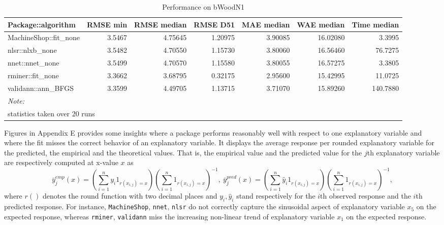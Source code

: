 \begin{Schunk}
\begingroup\fontsize{7}{9}\selectfont

\begin{longtable}[t]{lrrrrrr}
\caption{\label{tab:unnamed-chunk-4}Performance on bWoodN1}\\
\toprule
Package::algorithm & RMSE min & RMSE median & RMSE D51 & MAE median & WAE median & Time median\\
\midrule
MachineShop::fit\_none & 3.5467 & 4.75645 & 1.20975 & 3.90085 & 16.02080 & 3.3995\\
nlsr::nlxb\_none & 3.5482 & 4.70550 & 1.15730 & 3.80060 & 16.56460 & 76.7275\\
nnet::nnet\_none & 3.5499 & 4.70570 & 1.15580 & 3.80055 & 16.57275 & 3.3805\\
rminer::fit\_none & 3.3662 & 3.68795 & 0.32175 & 2.95600 & 15.42995 & 11.0725\\
validann::ann\_BFGS & 3.3599 & 4.49705 & 1.13715 & 3.71070 & 15.89260 & 140.7880\\
\bottomrule
\multicolumn{7}{l}{\textit{Note: }}\\
\multicolumn{7}{l}{statistics taken over 20 runs}\\
\end{longtable}
\endgroup{}

\end{Schunk}

Figures in Appendix E provides some insights where a package performs
reasonably well with respect to one explanatory variable and where the
fit misses the correct behavior of an explanatory variable. It displays
the average response per rounded explanatory variable for the predicted,
the empirical and the theoretical values. That is, the empirical value
and the predicted value for the \(j\)th explanatory variable are
respectively computed at x-value \(x\) as \[
\bar y^{emp}_j(x) =  \left(\sum_{i=1}^n y_i 1_{r(x_{i,j}) = x} \right)
\left(\sum_{i=1}^n 1_{r(x_{i,j}) = x}\right)^{-1},~
\bar y^{pred}_j(x) = \left(\sum_{i=1}^n \hat y_i 1_{r(x_{i,j}) = x} \right) 
\left(\sum_{i=1}^n 1_{r(x_{i,j}) = x}\right)^{-1} ,
\] where \(r()\) denotes the round function with two decimal places and
\(y_i, \hat y_i\) stand respectively for the \(i\)th observed response
and the \(i\)th predicted response. For instance, \texttt{MachineShop},
\texttt{nnet}, \texttt{nlsr} do not correctly capture the sinusoidal
aspect of explanatory variable \(x_5\) on the expected response, whereas
\texttt{rminer}, \texttt{validann} miss the increasing non-linear trend
of explanatory variable \(x_1\) on the expected response.

